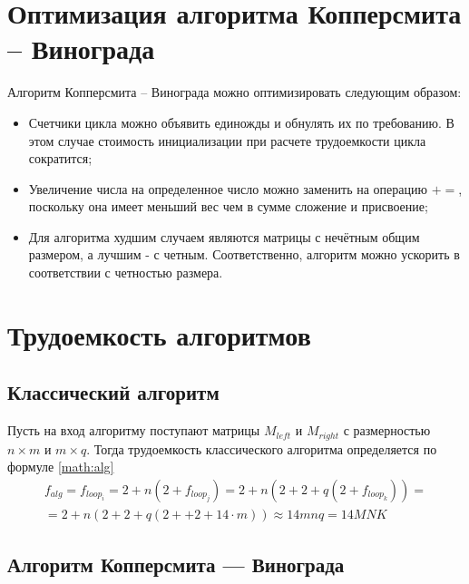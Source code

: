 \section{Оптимизация алгоритма Копперсмита -- Винограда}\label{sect:optimize}
Алгоритм Копперсмита -- Винограда можно оптимизировать следующим образом:
\begin{itemize}
	\item Счетчики цикла можно объявить единожды и обнулять их по требованию. В этом случае стоимость инициализации при расчете трудоемкости цикла сократится;
	\item Увеличение числа на определенное число можно заменить на операцию $+=$, поскольку она имеет меньший вес чем в сумме сложение и присвоение;
	\item Для алгоритма худшим случаем являются матрицы с нечётным общим размером, а лучшим - с четным. Соответственно, алгоритм можно ускорить в соответствии с четностью размера.
\end{itemize}

\section{Трудоемкость алгоритмов}

\subsection{Классический алгоритм}

Пусть на вход алгоритму поступают матрицы $M_{left}$ и $M_{right}$ с размерностью $n \times m$ и $m \times q$. Тогда трудоемкость классического алгоритма определяется по формуле \ref{math:alg}
\begin{multline}\label{math:alg}
	f_{alg} = f_{loop_i} = 2 + n\left(2 + f_{loop_j}\right) = 2 + n\left(2 + 2 + q\left(2 + f_{loop_k}\right)\right) = \\
	= 2 + n\left(2 + 2 + q\left(2 + +2 + 14 \cdot m\right)\right) \approx 14mnq = 14MNK
\end{multline}
\subsection{Алгоритм Копперсмита — Винограда}

